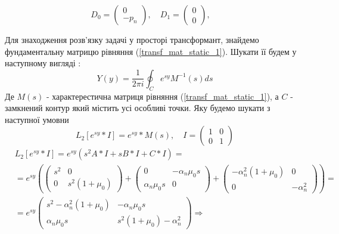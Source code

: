 \begin{equation*}
    D_0 = \begin{pmatrix}
        0 \\
        -p_n
    \end{pmatrix}, \quad
    D_1 = \begin{pmatrix}
        0 \\
        0
    \end{pmatrix}, \quad
\end{equation*}

Для знаходження розв'язку задачі у просторі трансформант, знайдемо фундаментальну матрицю рівняння (\ref{transf_mat_static_1}).
Шукати її будем у наступному вигляді \cite{gantmaher}:
\begin{equation}
    Y(y) = \frac{1}{2\pi i} \oint_C e^{sy} M^{-1}(s)ds
\end{equation}
Де $M(s)$ - характерестична матриця рівняння (\ref{transf_mat_static_1}), а $C$ - замкнений контур який містить усі особливі точки. Яку будемо шукати з наступної умовни
\begin{equation}
    L_2\left[ e^{sy}*I \right] = e^{sy} * M(s), \quad I = \begin{pmatrix} 1 & 0 \\ 0 & 1 \end{pmatrix}
\end{equation}
\begin{align*}
    &L_2\left[ e^{sy}*I \right] = e^{sy} \left( s^2A * I + s B*I + C*I \right) = \\
    &=e^{sy} \left( \begin{pmatrix}
        s^2 & 0 \\
        0 & s^2 (1 + \mu_0)
    \end{pmatrix} + \begin{pmatrix}
        0 & -\alpha_n \mu_0 s\\
        \alpha_n \mu_0 s & 0
    \end{pmatrix} + \begin{pmatrix}
        -\alpha_n^2(1 + \mu_0) & 0 \\
        0 & -\alpha_n^2
    \end{pmatrix} \right) =  \\
    &=e^{sy} \begin{pmatrix}
        s^2 -\alpha_n^2(1 + \mu_0) & -\alpha_n \mu_0 s \\
        \alpha_n \mu_0 s & s^2 (1 + \mu_0) -\alpha_n^2
     \end{pmatrix} \Rightarrow
\end{align*}

